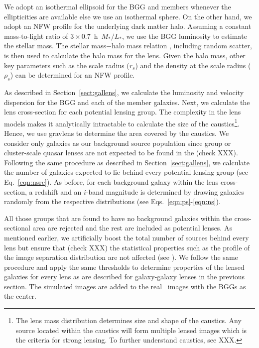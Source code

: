 \documentclass[useAMS,usenatbib,a4paper]{mn2e}
\begin{document}
We adopt an isothermal ellipsoid for the BGG and members whenever the
ellipticities are available else we use an isothermal sphere. On the other hand, we
adopt an NFW profile for the underlying dark matter halo. Assuming a constant
mass-to-light ratio of $3 \times 0.7$~h~$M_{*}/L_{*}$, we use the BGG luminosity
to estimate the stellar mass. The stellar mass$-$halo mass relation
\citep{behroozi13}, including random scatter, is then used to calculate the halo
mass for the lens. Given the halo mass, other key parameters such as the scale
radius ($r_s$) and the density at the scale radius ($\rho_s$) can be determined for an
NFW profile. 

As described in Section~\ref{sect:gallens}, we calculate the luminosity and
velocity dispersion for the BGG and each of the member galaxies. Next, we
calculate the lens cross-section for each potential lensing group. The
complexity in the lens models makes it analytically intractable to calculate the
size of the caustics\footnote{The lens mass distribution determines size and
shape of the caustics. Any source located within the caustics will form multiple
lensed images which is the criteria for strong lensing. To further
understand caustics, see XXX.}.  Hence, we use {\sc
gravlens} to determine the area covered by the caustics. We consider only
galaxies as our background source population since group or cluster-scale quasar
lenses are not expected to be found in the \cfhtls (check XXX).  Following the same
procedure as described in Section~\ref{sect:gallens}, we calculate the number of
galaxies expected to lie behind every potential lensing group (see
Eq.~\ref{eqn:nsrc}). As before, for each background galaxy within the lens cross-section, a
redshift and an $i$-band magnitude is determined by drawing galaxies randomly
from the respective distributions (see Eqs.~\ref{eqn:ps}-\ref{eqn:ns}). 

All those groups that are found to have no background galaxies within the
cross-sectional area are rejected and the rest are included as potential lenses.
As mentioned earlier, we artificially boost the total number of sources behind
every lens but ensure that (check XXX) the statistical properties such as the profile of the
image separation distribution are not affected (see ). We
follow the same procedure and apply the same thresholds to determine properties
of the lensed galaxies for every lens as are described for galaxy-galaxy lenses
in the previous section. The simulated images are added to the real \cfhtls~images
with the BGGs as the center.
\end{document}
